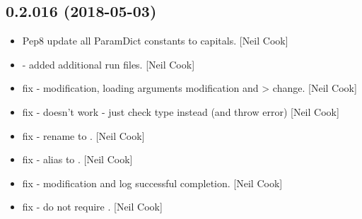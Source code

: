 \documentclass[a4paper,10pt,english]{report}
\begin{document}
\subsection{0.2.016 (2018-05-03)}
\label{\detokenize{misc/changelog:id444}}\begin{itemize}
\item {} 
Pep8 update all ParamDict constants to capitals. {[}Neil Cook{]}

\item {} 
 - added additional run files. {[}Neil Cook{]}

\item {} 
 fix -  modification, loading arguments modification
and  \textendash{}\textgreater{}  change. {[}Neil Cook{]}

\item {} 
 fix -  doesn’t work - just check type instead (and
throw error) {[}Neil Cook{]}

\item {} 
 fix - rename  to . {[}Neil Cook{]}

\item {} 
 fix - alias to . {[}Neil Cook{]}

\item {} 
 fix -  modification and log successful
completion. {[}Neil Cook{]}

\item {} 
 fix - do not require . {[}Neil Cook{]}

\end{itemize}
\end{document}
